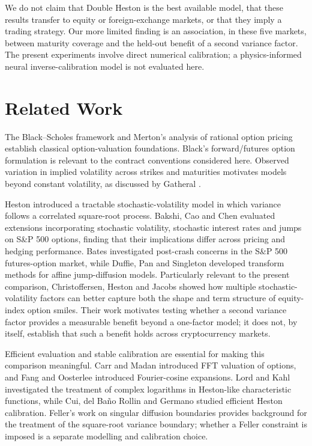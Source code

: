 \documentclass[runningheads]{llncs}
\begin{document}
We do not claim that Double Heston is the best available model, that
these results transfer to equity or foreign-exchange markets, or that
they imply a trading strategy. Our more limited finding is an
association, in these five markets, between maturity coverage and the
held-out benefit of a second variance factor. The present experiments
involve direct numerical calibration; a physics-informed neural
inverse-calibration model is not evaluated here.

\section{Related Work}
\label{sec:related}

The Black--Scholes framework \cite{ref:bs} and Merton's analysis of
rational option pricing \cite{ref:merton} establish classical
option-valuation foundations. Black's forward/futures option formulation
\cite{ref:black76} is relevant to the contract conventions considered
here. Observed variation in implied volatility across strikes and
maturities motivates models beyond constant volatility, as discussed by
Gatheral \cite{ref:gatheral}.

Heston \cite{ref:heston} introduced a tractable stochastic-volatility
model in which variance follows a correlated square-root process.
Bakshi, Cao and Chen \cite{ref:bakshi} evaluated extensions
incorporating stochastic volatility, stochastic interest rates and jumps
on S\&P 500 options, finding that their implications differ across
pricing and hedging performance. Bates \cite{ref:bates} investigated
post-crash concerns in the S\&P 500 futures-option market, while Duffie,
Pan and Singleton \cite{ref:duffie} developed transform methods for
affine jump-diffusion models. Particularly relevant to the present
comparison, Christoffersen, Heston and Jacobs \cite{ref:chj} showed how
multiple stochastic-volatility factors can better capture both the shape
and term structure of equity-index option smiles. Their work motivates
testing whether a second variance factor provides a measurable benefit
beyond a one-factor model; it does not, by itself, establish that such a
benefit holds across cryptocurrency markets.

Efficient evaluation and stable calibration are essential for making
this comparison meaningful. Carr and Madan \cite{ref:carrmadan}
introduced FFT valuation of options, and Fang and Oosterlee
\cite{ref:fangoost} introduced Fourier-cosine expansions. Lord and Kahl
\cite{ref:lordkahl} investigated the treatment of complex logarithms in
Heston-like characteristic functions, while Cui, del Ba\~{n}o Rollin and
Germano \cite{ref:cui} studied efficient Heston calibration. Feller's
work on singular diffusion boundaries \cite{ref:feller} provides
background for the treatment of the square-root variance boundary;
whether a Feller constraint is imposed is a separate modelling and
calibration choice.
\end{document}
